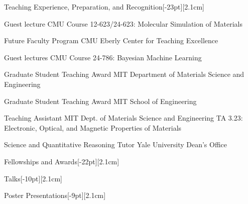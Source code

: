 \documentclass{cv} %
\begin{document}
\begin{cvSection}{Teaching Experience, Preparation, and Recognition}[-23pt][2.1cm]

    {Guest lecture}
    {CMU Course 12-623/24-623: Molecular Simulation of Materials}
    {}

    \cvItem{}
    {Future Faculty Program}
    {CMU Eberly Center for Teaching Excellence}
    {}

    \cvItem{}
    {Guest lectures}
    {CMU Course 24-786: Bayesian Machine Learning}
    {}
  
    {Graduate Student Teaching Award}
    {MIT Department of Materials Science and Engineering}
    {}

    \cvItem{}
    {Graduate Student Teaching Award}
    {MIT School of Engineering}
    {}
  
    {Teaching Assistant}
    {MIT Dept. of Materials Science and Engineering}
    {\vspace{14pt}TA 3.23: Electronic, Optical, and Magnetic Properties of Materials}

    {Science and Quantitative Reasoning Tutor}
    {Yale University Dean's Office}
    {}

\end{cvSection}

\begin{cvSection}{Fellowships and Awards}[-22pt][2.1cm]
    
\end{cvSection}

\begin{pubsSection}[-7pt][2.1cm]
  
\end{pubsSection}

\begin{cvSection}{Talks}[-10pt][2.1cm]
    
\end{cvSection}

\begin{cvSection}{Poster Presentations}[-9pt][2.1cm]
    
\end{cvSection}
\end{document}

